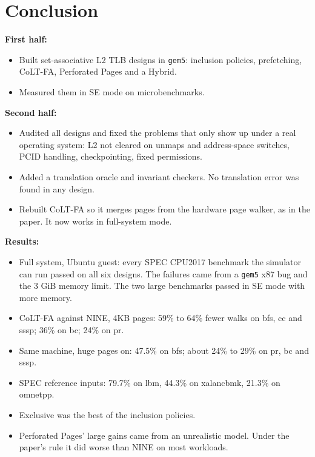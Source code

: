 \section{Conclusion}
\textbf{First half:}
\begin{itemize}
    \item Built set-associative L2 TLB designs in \texttt{gem5}: inclusion policies, prefetching, CoLT-FA, Perforated Pages and a Hybrid.
    \item Measured them in SE mode on microbenchmarks.
\end{itemize}
\textbf{Second half:}
\begin{itemize}
    \item Audited all designs and fixed the problems that only show up under a real operating system: L2 not cleared on unmaps and address-space switches, PCID handling, checkpointing, fixed permissions.
    \item Added a translation oracle and invariant checkers. No translation error was found in any design.
    \item Rebuilt CoLT-FA so it merges pages from the hardware page walker, as in the paper. It now works in full-system mode.
\end{itemize}

\textbf{Results:}
\begin{itemize}
    \item Full system, Ubuntu guest: every SPEC CPU2017 benchmark the simulator can run passed on all six designs. The failures came from a \texttt{gem5} x87 bug and the 3 GiB memory limit. The two large benchmarks passed in SE mode with more memory.
    \item CoLT-FA against NINE, 4KB pages: 59\% to 64\% fewer walks on bfs, cc and sssp; 36\% on bc; 24\% on pr.
    \item Same machine, huge pages on: 47.5\% on bfs; about 24\% to 29\% on pr, bc and sssp.
    \item SPEC reference inputs: 79.7\% on lbm, 44.3\% on xalancbmk, 21.3\% on omnetpp.
    \item Exclusive was the best of the inclusion policies.
    \item Perforated Pages' large gains came from an unrealistic model. Under the paper's rule it did worse than NINE on most workloads.
\end{itemize}
